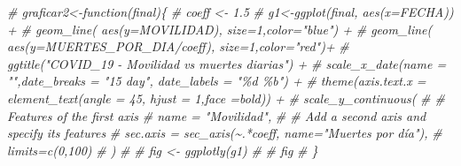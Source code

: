 \documentclass[
]{article}
\newenvironment{Shaded}{\begin{snugshade}}{\end{snugshade}}
\newcommand{\CommentTok}[1]{\textcolor[rgb]{0.56,0.35,0.01}{\textit{#1}}}
\begin{document}
\begin{Shaded}
\begin{Highlighting}[]
\CommentTok{\# graficar2\textless{}{-}function(final)\{}
\CommentTok{\#   coeff \textless{}{-} 1.5}
\CommentTok{\#   g1\textless{}{-}ggplot(final, aes(x=FECHA)) +}
\CommentTok{\#     geom\_line( aes(y=MOVILIDAD), size=1,color="blue") +}
\CommentTok{\#     geom\_line( aes(y=MUERTES\_POR\_DIA/coeff), size=1,color="red")+}
\CommentTok{\#     ggtitle("COVID\_19 {-} Movilidad vs muertes diarias") +}
\CommentTok{\#     scale\_x\_date(name = "",date\_breaks = "15 day", date\_labels =  "\%d \%b") +}
\CommentTok{\#     theme(axis.text.x = element\_text(angle = 45, hjust = 1,face =\textquotesingle{}bold\textquotesingle{})) +}
\CommentTok{\#     scale\_y\_continuous(}
\CommentTok{\#       \# Features of the first axis}
\CommentTok{\#       name = "Movilidad",}
\CommentTok{\#       \# Add a second axis and specify its features}
\CommentTok{\#       sec.axis = sec\_axis(\textasciitilde{}.*coeff, name="Muertes por día"),}
\CommentTok{\#       limits=c(0,100)}
\CommentTok{\#     )}
\CommentTok{\#   }
\CommentTok{\#   fig \textless{}{-} ggplotly(g1)}
\CommentTok{\#   }
\CommentTok{\#   fig  }
\CommentTok{\# \}}


\end{Highlighting}
\end{Shaded}
\end{document}
